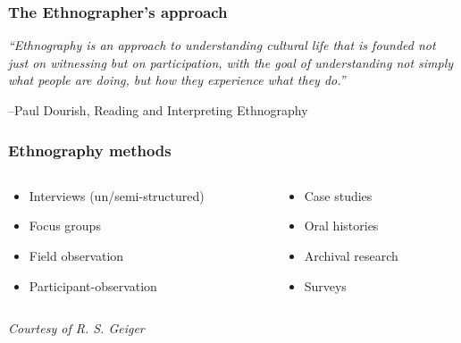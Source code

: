 \documentclass[xcolor=dvipsnames]{beamer}
\begin{document}
\begin{frame}
\frametitle{The Ethnographer's approach}

{\em
``Ethnography is an approach to understanding cultural life that is founded
not just on witnessing but on participation, with the goal of
understanding
not simply what people are doing, but how they experience what they
do.''}
\vspace{3em}
\begin{flushright}
--Paul Dourish, Reading and Interpreting Ethnography
\end{flushright}
\end{frame}


\begin{frame}
\end{frame}
\usebackgroundtemplate{ }  

\begin{frame}
\frametitle{Ethnography methods}
\begin{columns}
\begin{column}{0.5\linewidth}
\begin{itemize}[label={$\bullet$}]
\item Interviews (un/semi-structured)
\item Focus groups
\item Field observation
\item Participant-observation
\end{itemize}
\end{column}
\begin{column}{0.5\linewidth}
\begin{itemize}[label={$\bullet$}]
\item Case studies
\item Oral histories
\item Archival research
\item Surveys
\end{itemize}
\end{column}
\end{columns}
\vspace{3em}
\begin{flushright}
\footnotesize
\em
Courtesy of R. S. Geiger
\end{flushright}

\end{frame}
\end{document}
